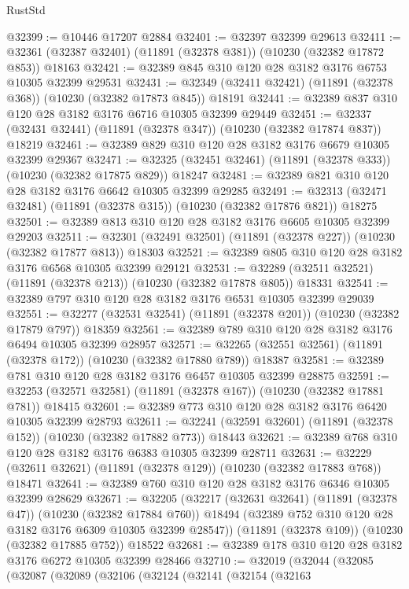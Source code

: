 \begin{lexlean}{RustStd}
\begin{coremodule}
@32399 := @10446 @17207 @2884
@32401 := @32397 @32399 @29613
@32411 := @32361 (@32387 @32401) (@11891 (@32378 @381)) (@10230 (@32382 @17872 @853)) @18163
@32421 := @32389 @845 @310 @120 @28 @3182 @3176 @6753 @10305 @32399 @29531
@32431 := @32349 (@32411 @32421) (@11891 (@32378 @368)) (@10230 (@32382 @17873 @845)) @18191
@32441 := @32389 @837 @310 @120 @28 @3182 @3176 @6716 @10305 @32399 @29449
@32451 := @32337 (@32431 @32441) (@11891 (@32378 @347)) (@10230 (@32382 @17874 @837)) @18219
@32461 := @32389 @829 @310 @120 @28 @3182 @3176 @6679 @10305 @32399 @29367
@32471 := @32325 (@32451 @32461) (@11891 (@32378 @333)) (@10230 (@32382 @17875 @829)) @18247
@32481 := @32389 @821 @310 @120 @28 @3182 @3176 @6642 @10305 @32399 @29285
@32491 := @32313 (@32471 @32481) (@11891 (@32378 @315)) (@10230 (@32382 @17876 @821)) @18275
@32501 := @32389 @813 @310 @120 @28 @3182 @3176 @6605 @10305 @32399 @29203
@32511 := @32301 (@32491 @32501) (@11891 (@32378 @227)) (@10230 (@32382 @17877 @813)) @18303
@32521 := @32389 @805 @310 @120 @28 @3182 @3176 @6568 @10305 @32399 @29121
@32531 := @32289 (@32511 @32521) (@11891 (@32378 @213)) (@10230 (@32382 @17878 @805)) @18331
@32541 := @32389 @797 @310 @120 @28 @3182 @3176 @6531 @10305 @32399 @29039
@32551 := @32277 (@32531 @32541) (@11891 (@32378 @201)) (@10230 (@32382 @17879 @797)) @18359
@32561 := @32389 @789 @310 @120 @28 @3182 @3176 @6494 @10305 @32399 @28957
@32571 := @32265 (@32551 @32561) (@11891 (@32378 @172)) (@10230 (@32382 @17880 @789)) @18387
@32581 := @32389 @781 @310 @120 @28 @3182 @3176 @6457 @10305 @32399 @28875
@32591 := @32253 (@32571 @32581) (@11891 (@32378 @167)) (@10230 (@32382 @17881 @781)) @18415
@32601 := @32389 @773 @310 @120 @28 @3182 @3176 @6420 @10305 @32399 @28793
@32611 := @32241 (@32591 @32601) (@11891 (@32378 @152)) (@10230 (@32382 @17882 @773)) @18443
@32621 := @32389 @768 @310 @120 @28 @3182 @3176 @6383 @10305 @32399 @28711
@32631 := @32229 (@32611 @32621) (@11891 (@32378 @129)) (@10230 (@32382 @17883 @768)) @18471
@32641 := @32389 @760 @310 @120 @28 @3182 @3176 @6346 @10305 @32399 @28629
@32671 := @32205
    (@32217
      (@32631 @32641)
      (@11891 (@32378 @47))
      (@10230 (@32382 @17884 @760))
      @18494
      (@32389 @752 @310 @120 @28 @3182 @3176 @6309 @10305 @32399 @28547))
    (@11891 (@32378 @109))
    (@10230 (@32382 @17885 @752))
    @18522
@32681 := @32389 @178 @310 @120 @28 @3182 @3176 @6272 @10305 @32399 @28466
@32710 := @32019
    (@32044
      (@32085
        (@32087
          (@32089
            (@32106
              (@32124
                (@32141
                  (@32154
                    (@32163

\end{coremodule}
\end{lexlean}
